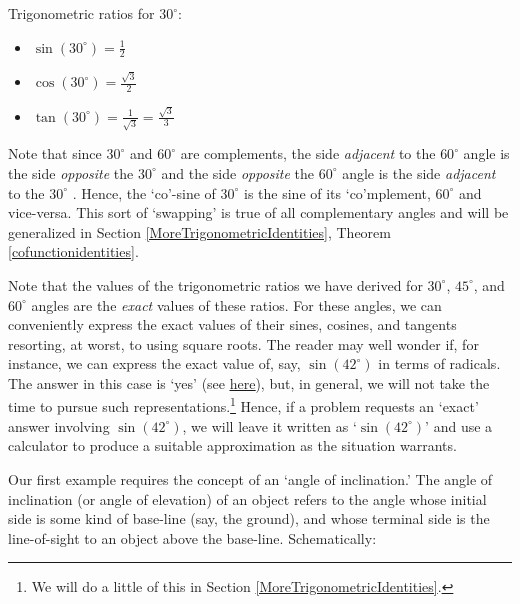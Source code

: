 \documentclass{ximera}
\begin{document}
Trigonometric ratios for $30^{\circ}$:


\begin{itemize}

\item  $\sin\left(30^{\circ}\right) = \frac{1}{2}$

\item  $\cos\left(30^{\circ}\right) = \frac{\sqrt{3}}{2}$

\item  $\tan\left(30^{\circ}\right) = \frac{1}{\sqrt{3}} = \frac{\sqrt{3}}{3}$

\end{itemize}




Note that since $30^{\circ}$ and $60^{\circ}$ are complements, the side \textit{adjacent} to the $60^{\circ}$ angle is the side \textit{opposite} the $30^{\circ}$ and the side \textit{opposite}  the $60^{\circ}$ angle is the side \textit{adjacent} to the $30^{\circ}$ .  Hence, the `co'-sine of $30^{\circ}$ is the sine of its `co'mplement, $60^{\circ}$ and vice-versa.  This sort of `swapping' is true of all complementary angles and will be generalized in Section \ref{MoreTrigonometricIdentities}, Theorem \ref{cofunctionidentities}.



Note that the values of the trigonometric ratios we have derived for $30^{\circ}$, $45^{\circ}$, and $60^{\circ}$ angles are the \textit{exact} values of these ratios. For these angles, we can conveniently express the exact values of their sines, cosines, and tangents  resorting, at worst, to using square roots.    The reader may well wonder if, for instance, we can express the exact value of, say, $\sin\left(42^{\circ}\right)$ in terms of radicals.  The answer in this case is `yes'  (see \href{https://math.la.asu.edu/~surgent/mat170/Exact_Trig_Values.pdf}{\underline{here}}), but, in general, we will not take the time to pursue such representations.\footnote{We will do a little of this in Section \ref{MoreTrigonometricIdentities}.}  Hence, if a problem requests an `exact' answer involving $\sin\left(42^{\circ}\right)$, we will leave it written as `$\sin\left(42^{\circ}\right)$'  and use a calculator to produce a suitable approximation as the situation warrants.

Our first example requires the concept of an `angle of inclination.'  The  angle of inclination (or  angle of elevation) of an object refers to the angle whose initial side is some kind of base-line (say, the ground), and whose terminal side is the line-of-sight to an object above the base-line.  Schematically:
\label{angleofelevation}
\end{document}
